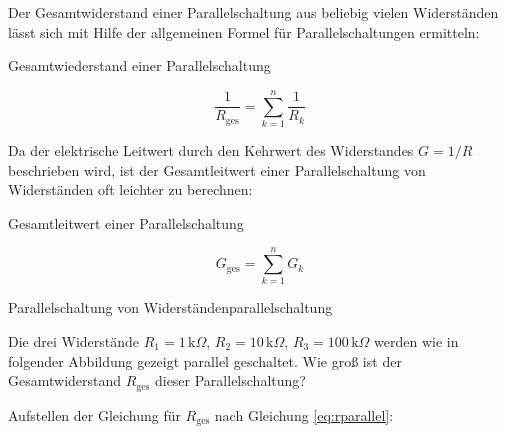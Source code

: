 \begin{frame}
{		
		Der Gesamtwiderstand einer Parallelschaltung aus beliebig vielen Widerständen lässt sich mit Hilfe der allgemeinen Formel
		für Parallelschaltungen ermitteln:
		
		\begin{Merksatz}{Gesamtwiederstand einer Parallelschaltung}
			
			\begin{equation}
				\frac{1}{R_\mathrm{ges}} = \sum_{k=1}^{n} \frac{1}{R_k}
				\label{eq:rparallel}
			\end{equation}
		\end{Merksatz}
		
		
		Da der elektrische Leitwert durch den Kehrwert des Widerstandes $G=1/R$ beschrieben wird, ist der Gesamtleitwert einer 
		Parallelschaltung von Widerständen oft leichter zu berechnen:
		
		
		
		\begin{Merksatz}{Gesamtleitwert einer Parallelschaltung}
			
			\begin{equation}
				G_\mathrm{ges} = \sum_{k=1}^{n} G_k 
			\end{equation}
		\end{Merksatz}
		
		\begin{bsp}{Parallelschaltung von Widerständen}{parallelschaltung}
			
			Die drei Widerstände $R_1 = 1 \, \mathrm{k}\Omega$, $R_2 = 10 \, \mathrm{k}\Omega$, $R_3 = 100 \, \mathrm{k}\Omega$
			werden wie in folgender Abbildung gezeigt parallel geschaltet. Wie groß ist der Gesamtwiderstand $R_\mathrm{ges}$ dieser 
			Parallelschaltung?
			
			
			\begin{center}


				
				
			\end{center}
			
			Aufstellen der Gleichung für $R_\mathrm{ges}$ nach Gleichung \ref{eq:rparallel}:
			

\end{bsp}}
\end{frame}
